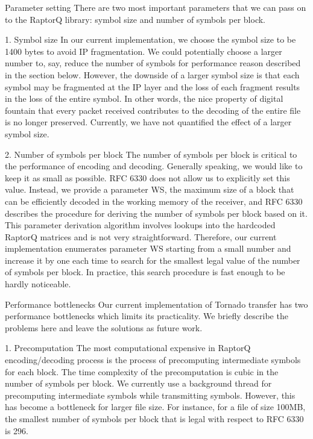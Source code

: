 \documentclass{sig-alternate-10pt}
\begin{document}
Parameter setting There are two most important parameters that we can pass on
to the RaptorQ library: symbol size and number of symbols per block.

1. Symbol size In our current implementation, we choose the symbol size to be
1400 bytes to avoid IP fragmentation. We could potentially choose a larger
number to, say, reduce the number of symbols for performance reason described
in the section below. However, the downside of a larger symbol size is that
each symbol may be fragmented at the IP layer and the loss of each fragment
results in the loss of the entire symbol. In other words, the nice property of
digital fountain that every packet received contributes to the decoding of the
entire file is no longer preserved. Currently, we have not quantified the
effect of a larger symbol size.

2. Number of symbols per block The number of symbols per block is critical to
the performance of encoding and decoding. Generally speaking, we would like to
keep it as small as possible. RFC 6330 does not allow us to explicitly set this
value. Instead, we provide a parameter WS, the maximum size of a block that can
be efficiently decoded in the working memory of the receiver, and RFC 6330
describes the procedure for deriving the number of symbols per block based on
it. This parameter derivation algorithm involves lookups into the hardcoded
RaptorQ matrices and is not very straightforward. Therefore, our current
implementation enumerates parameter WS starting from a small number and
increase it by one each time to search for the smallest legal value of the
number of symbols per block. In practice, this search procedure is fast enough
to be hardly noticeable.

Performance bottlenecks Our current implementation of Tornado transfer has two
performance bottlenecks which limits its practicality. We briefly describe the
problems here and leave the solutions as future work.

1. Precomputation The most computational expensive in RaptorQ encoding/decoding
process is the process of precomputing intermediate symbols for each block. The
time complexity of the precomputation is cubic in the number of symbols per
block. We currently use a background thread for precomputing intermediate
symbols while transmitting symbols. However, this has become a bottleneck for
larger file size. For instance, for a file of size 100MB, the smallest number
of symbols per block that is legal with respect to RFC 6330 is 296.
\end{document}
